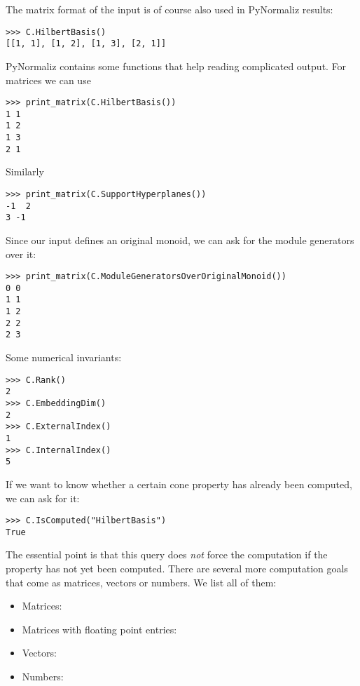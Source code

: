\begin{small}
The matrix format of the input is of course also used in PyNormaliz results:
\begin{Verbatim}
>>> C.HilbertBasis()
[[1, 1], [1, 2], [1, 3], [2, 1]]
\end{Verbatim}
PyNormaliz contains some functions that help reading complicated output. For matrices we can use
\begin{Verbatim}
>>> print_matrix(C.HilbertBasis())
1 1
1 2
1 3
2 1
\end{Verbatim}
Similarly
\begin{Verbatim}
>>> print_matrix(C.SupportHyperplanes())
-1  2
3 -1
\end{Verbatim}
Since our input defines an original monoid, we can ask for the module generators over it:
\begin{Verbatim}
>>> print_matrix(C.ModuleGeneratorsOverOriginalMonoid())
0 0
1 1
1 2
2 2
2 3
\end{Verbatim}
Some numerical invariants:
\begin{Verbatim}
>>> C.Rank()
2
>>> C.EmbeddingDim()
2
>>> C.ExternalIndex()
1
>>> C.InternalIndex()
5
\end{Verbatim}

If we want to know whether a certain cone property has already been computed, we can ask for it:
\begin{Verbatim}
>>> C.IsComputed("HilbertBasis")
True
\end{Verbatim}
The essential point is that this query does \emph{not} force the computation if the property has not yet been computed.
There are several more computation goals that come as matrices, vectors or numbers. We list all of them:
\begin{itemize}
	\item Matrices: 
	\item Matrices with floating point entries: 
	\item Vectors: 
	\item Numbers: 
\end{itemize}


\end{small}
